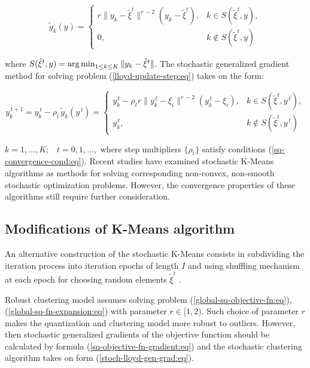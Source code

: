 \begin{equation}
    \label{stoch-lloyd-grad-component:eq}
    \tilde{g}_k(y) = \begin{cases}
        r\|y_{k} - \tilde{\xi}^t\|^{r\,-2} (y_{k} - \tilde{\xi}^t), 
        & k \in S(\tilde{\xi}^t,y),\\
        0,& k\notin S(\tilde{\xi}^t,y)
    \end{cases}
\end{equation}

\noindent where $ S(\tilde{\xi}^t,y) = \operatorname*{arg\,min}_{1 \leq k \leq K} \| y_k - \tilde{\xi}^t \| $. The stochastic generalized gradient method for solving problem (\ref{lloyd-update-step:eq}) takes on the form:

\begin{equation}
    \label{stoch-lloyd-gen-grad:eq}
    y_k^{\,t+1} = y_k^{\,t} - \rho_t \,\tilde{g}_k(y^{\,t}) = \begin{cases}
        y_k^{\,t} - \rho_t  r\|y_k^{\,t} - \xi_i\|^{r\,-2}(y_k^{\,t} - \xi_i), & k\in S(\tilde{\xi}^t,y^{\,t}), \\
        y_k^{\,t}, & k\notin S(\tilde{\xi}^t,y^{\,t})
    \end{cases}
\end{equation}

\noindent $ k=1,\ldots,K;\;\;\;t=0,1,\ldots, $ where step multipliers $\{\rho_t\}$ satisfy conditions (\ref{sq-convergence-cond:eq}). Recent studies \cite{Tang_2017,Zhao_Lan_Chen_Ngo_2021} have examined stochastic K-Means algorithms as methods for solving corresponding non-convex, non-smooth stochastic optimization problems. However, the convergence properties of these algorithms still require further consideration.

\subsection{Modifications of K-Means algorithm}

An alternative construction of the stochastic K-Means consists in subdividing the iteration process into iteration epochs of length $I$ and using shuffling mechanism at each epoch for choosing random elements $\tilde{\xi}^t$ \cite{bottou2009curiously,montavon2012neural}. 

Robust clustering model assumes solving problem (\ref{global-sq-objective-fn:eq}), (\ref{global-sq-fn-expansion:eq}) with parameter $r\in [1,2)$. Such choice of parameter $r$ makes the quantization and clustering model more robust to outliers. However, then stochastic generalized gradients of the objective function should be calculated by formula (\ref{sq-objective-fn-gradient:eq}) and the stochastic clustering algorithm takes on form (\ref{stoch-lloyd-gen-grad:eq}).

